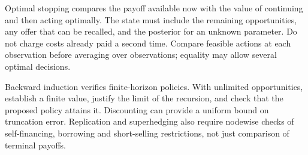 Optimal stopping compares the payoff available now with the value of continuing and then acting optimally. The state must include the remaining opportunities, any offer that can be recalled, and the posterior for an unknown parameter. Do not charge costs already paid a second time. Compare feasible actions at each observation before averaging over observations; equality may allow several optimal decisions.

Backward induction verifies finite-horizon policies. With unlimited opportunities, establish a finite value, justify the limit of the recursion, and check that the proposed policy attains it. Discounting can provide a uniform bound on truncation error. Replication and superhedging also require nodewise checks of self-financing, borrowing and short-selling restrictions, not just comparison of terminal payoffs.
\par\smallskip
